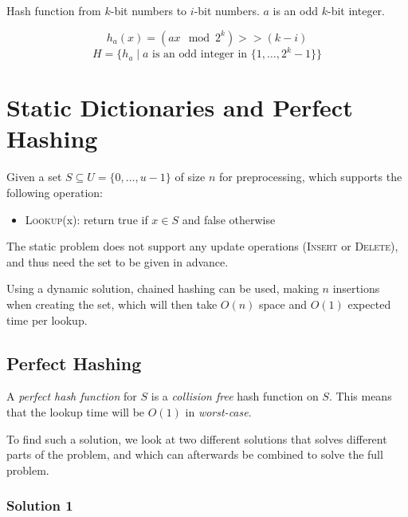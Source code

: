             Hash function from $k$-bit numbers to $i$-bit numbers. $a$ is an odd $k$-bit integer.

            \begin{definition}
                \[ h_a(x) = (ax \mod 2^k) >> (k - i) \]
                \[ H = \{h_a \mid a \text{ is an odd integer in } \{1, \ldots, 2^k - 1\}\} \]
            \end{definition}

    \section{Static Dictionaries and Perfect Hashing}

        \begin{definition}
            Given a set $S \subseteq U = \{0, \ldots, u-1\}$ of size $n$ for preprocessing, which supports the following operation:
            \begin{itemize}
                \item \textsc{Lookup}(x): return true if $x \in S$ and false otherwise
            \end{itemize}
        \end{definition}

        The static problem does not support any update operations (\textsc{Insert} or \textsc{Delete}), and thus need the set to be given in advance.

        Using a dynamic solution, chained hashing can be used, making $n$ insertions when creating the set, which will then take $O(n)$ space and $O(1)$ expected time per lookup.

        \subsection{Perfect Hashing}

            A \emph{perfect hash function} for $S$ is a \emph{collision free} hash function on $S$. This means that the lookup time will be $O(1)$ in \emph{worst-case}.

            To find such a solution, we look at two different solutions that solves different parts of the problem, and which can afterwards be combined to solve the full problem.

            \subsubsection{Solution 1}

